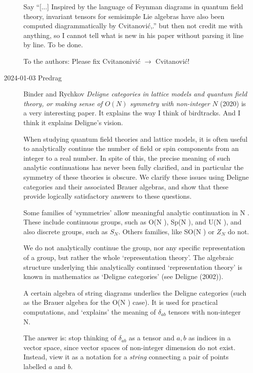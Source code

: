 \begin{description}
Say ``[...] Inspired by the language of Feynman diagrams in quantum field
theory, invariant tensors for semisimple Lie algebras have also been
computed diagrammatically by Cvitanovi{\'c},.'' but then not
credit me with anything,  so I cannot tell what is new in his paper
without parsing it line by line. To be done.

To the authors: Please fix Cvitanonivi{\'c} $\to$ Cvitanovi{\'c}!

\item[2024-01-03 Predrag]
        \label{2024-01-03PC}
Binder and Rychkov
{\em Deligne categories in lattice models and quantum field theory, or
making sense of {$O(N)$} symmetry with non-integer {$N$}}
(2020) is a very interesting paper. It explains the way I think of birdtracks.
And I think it explains Deligne's vision.

When studying quantum field theories and lattice models, it is often useful
to analytically continue the number of field or spin components from an integer to a real
number. In spite of this, the precise meaning of such analytic continuations has never been
fully clarified, and in particular the symmetry of these theories is obscure. We clarify these
issues using Deligne categories and their associated Brauer algebras, and show that these
provide logically satisfactory answers to these questions.

Some families of `symmetries' allow meaningful analytic continuation in N . These
include continuous groups, such as O(N ), Sp(N ), and U(N ), and also discrete groups,
such as $S_N$. Others families, like SO(N ) or  $Z_N$ do not.

We do not analytically continue the group, nor any specific representation of a group,
but rather the whole `representation theory'. The algebraic structure underlying this
analytically continued `representation theory' is known in mathematics as `Deligne
categories' (see 
{Deligne (2002)}).

A certain algebra of string diagrams underlies the Deligne categories
(such as the Brauer algebra for the O(N ) case). It is used for practical
computations, and `explains' the meaning of $\delta_{ab}$ tensors with
non-integer N.

The answer is: stop thinking of $\delta_{ab}$ as a tensor and ${a,b}$ as
indices in a vector space, since vector spaces of non-integer dimension
do not exist. Instead, view it as a notation for a \emph{string}
connecting a pair of points labelled ${a}$ and ${b}$.


\end{description}
